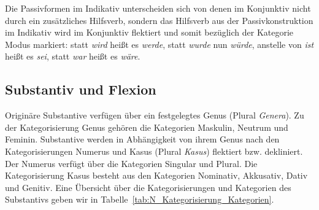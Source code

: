 \begin{table}
  \centering
  \caption{Ausschnitt aus den Passivparadigmen im Indikativ und im Konjunktiv}
  \label{tab:Pass_Ind_Pass_Konj}
\end{table}

Die Passivformen im Indikativ unterscheiden sich von denen im Konjunktiv nicht durch ein zusätzliches Hilfsverb, sondern das Hilfsverb aus der Passivkonstruktion im Indikativ wird im Konjunktiv flektiert und somit bezüglich der Kategorie Modus markiert: statt \textit{wird} heißt es \textit{werde}, statt \textit{wurde} nun \textit{würde}, anstelle von \textit{ist} heißt es \textit{sei}, statt \textit{war} heißt es \textit{wäre}. 


\subsection{Substantiv und Flexion}\label{subsection:Substantivflexion}

Originäre Substantive verfügen über ein festgelegtes Genus (Plural \textit{Genera}). Zu der Kategorisierung Genus gehören die Kategorien Maskulin, Neutrum und Feminin. Substantive werden in Abhängigkeit von ihrem Genus nach den Kategorisierungen Numerus und Kasus (Plural \textit{Kasus}) flektiert bzw. dekliniert. Der Numerus verfügt über die Kategorien Singular und Plural. Die Kategorisierung Kasus besteht aus den Kategorien Nominativ, Akkusativ, Dativ und Genitiv. Eine Übersicht über die Kategorisierungen und Kategorien des Substantivs geben wir in Tabelle~\ref{tab:N_Kategorisierung_Kategorien}. 

